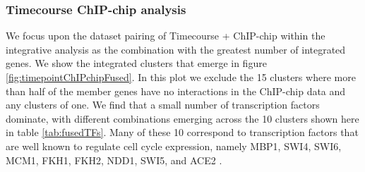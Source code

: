 \documentclass[]{article}
\begin{document}

\subsubsection{Timecourse ChIP-chip analysis}

We focus upon the dataset pairing of Timecourse + ChIP-chip within the integrative analysis as the combination with the greatest number of integrated genes. We show the integrated clusters that emerge in figure \ref{fig:timepointChIPchipFused}. In this plot we exclude the 15 clusters where more than half of the member genes have no interactions in the ChIP-chip data and any clusters of one. We find that a small number of transcription factors dominate, with different combinations emerging across the 10 clusters shown here in table \ref{tab:fusedTFs}. Many of these 10 correspond to transcription factors that are well known to regulate cell cycle expression, namely MBP1, SWI4, SWI6, MCM1, FKH1, FKH2, NDD1, SWI5, and ACE2 \citep{simon2001serial}.
\end{document}
